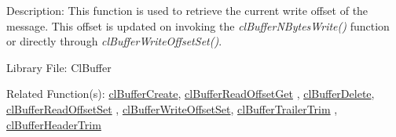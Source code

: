 \begin{Desc}
\item[Description:]This function is used to retrieve the current write offset of the message. This offset is updated on invoking the 
\textit{clBufferNBytesWrite()} function or directly through 
\textit{clBufferWriteOffsetSet()}.\end{Desc}
\begin{Desc}
\item[Library File:]Cl\-Buffer\end{Desc}
\begin{Desc}
\item[Related Function(s):]\hyperlink{pagebuf103}{cl\-Buffer\-Create}, \hyperlink{pagebuf117}{cl\-Buffer\-Read\-Offset\-Get} , 
\hyperlink{pagebuf105}{cl\-Buffer\-Delete}, \hyperlink{pagebuf119}{cl\-Buffer\-Read\-Offset\-Set} , 
\hyperlink{pagebuf120}{cl\-Buffer\-Write\-Offset\-Set}, \hyperlink{pagebuf125}{cl\-Buffer\-Trailer\-Trim} , 
\hyperlink{pagebuf124}{cl\-Buffer\-Header\-Trim} \end{Desc}


\newpage
